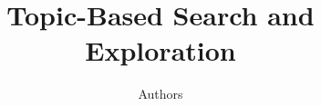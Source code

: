 \documentclass[letterpaper]{article}
\begin{document}
\title{Topic-Based Search and Exploration}
\author{Authors}
\maketitle














\end{document}
